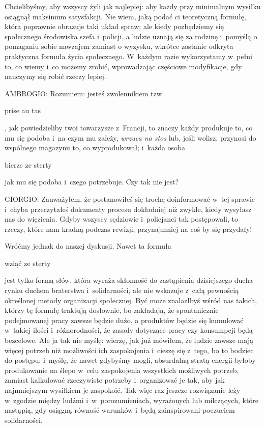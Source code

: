 \documentclass[oneside,polish,11pt,sfheadings]{mwbk}
\begin{document}
 
Chcielibyśmy, aby wszyscy żyli jak najlepiej: aby każdy przy minimalnym wysiłku osiągnął maksimum satysfakcji. Nie wiem,
jaką podać ci teoretyczną formułę, która poprawnie obrazuje taki układ spraw; ale kiedy pozbędziemy się społecznego
środowiska szefa i~policji, a ludzie uznają się za rodzinę i~pomyślą o pomaganiu sobie nawzajem zamiast o wyzysku,
wkrótce zostanie odkryta praktyczna formuła życia społecznego. W~każdym razie wykorzystamy w~pełni to, co wiemy i~co
możemy zrobić, wprowadzając częściowe modyfikacje, gdy nauczymy się robić rzeczy lepiej. 




 
\noindent AMBROGIO: Rozumiem: jesteś zwolennikiem tzw \begin{itshape}prise au tas \end{itshape}, jak
powiedzieliby twoi towarzysze z~Francji, to znaczy każdy produkuje to, co mu się podoba i~na czym mu zależy,
\textit{wrzuca na stos} lub, jeśli wolisz, przynosi do wspólnego magazynu to, co wyprodukował; i~każda osoba
 \begin{itshape}bierze ze sterty\end{itshape} jak mu się podoba i~czego potrzebuje. Czy tak
nie jest? 




 
\noindent GIORGIO: Zauważyłem, że postanowiłeś się trochę doinformować w~tej sprawie i~chyba przeczytałeś dokumenty procesu
dokładniej niż zwykle, kiedy wysyłasz nas do więzienia. Gdyby wszyscy sędziowie i~policjanci tak postępowali, to
rzeczy, które nam kradną podczas rewizji, przynajmniej na coś by się przydały! 

 
Wróćmy jednak do naszej dyskusji. Nawet ta formuła \begin{itshape}wziąć ze
sterty \end{itshape} jest tylko formą słów, która wyraża skłonność do zastąpienia dzisiejszego ducha
rynku duchem braterstwa i~solidarności, ale nie wskazuje z~całą pewnością określonej metody organizacji społecznej. Być
może znalazłbyś wśród nas takich, którzy tę formułę traktują dosłownie, bo zakładają, że spontanicznie podejmowanej
pracy zawsze będzie dużo, a produktów będzie się kumulować w~takiej ilości i~różnorodności, że zasady dotyczące pracy
czy konsumpcji będą bezcelowe. Ale ja tak nie myślę: wierzę, jak już mówiłem, że ludzie zawsze mają więcej potrzeb niż
możliwości ich zaspokojenia i~cieszę się z~tego, bo to bodziec do postępu; i~myślę, że nawet gdybyśmy mogli, absurdalną
stratą energii byłoby produkowanie na ślepo w~celu zaspokojenia wszystkich możliwych potrzeb, zamiast kalkulować
rzeczywiste potrzeby i~organizować je tak, aby jak najmniejszym wysiłkiem je zaspokoić. Tak więc raz jeszcze
rozwiązanie leży w~zgodzie między ludźmi i~w~porozumieniach, wyrażonych lub milczących, które nastąpią, gdy osiągną
równość warunków i~będą zainspirowani poczuciem solidarności. 
\end{document}
